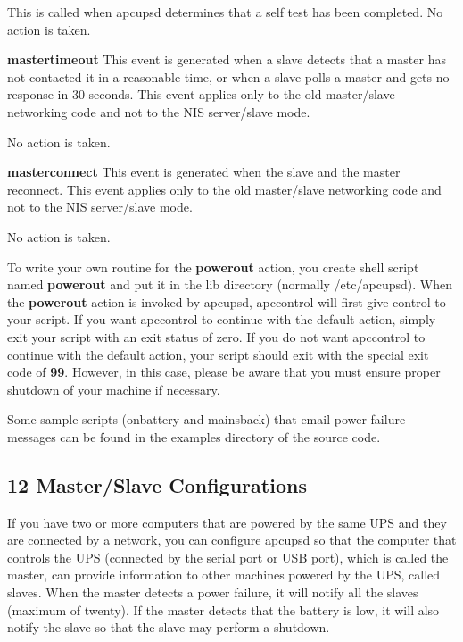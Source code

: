 \begin{description}
This is called when apcupsd determines that a self test has been completed. No
action is taken.  

\item {\bf mastertimeout}
This event is generated when a slave detects that a master has not contacted
it in a reasonable time, or when a slave polls a master and gets no response
in 30 seconds. This event applies only to the old master/slave networking code
and not to the NIS server/slave mode.  

No action is taken.  

\item {\bf masterconnect}
This event is generated when the slave and the master reconnect. This event
applies only to the old master/slave networking code and not to the NIS
server/slave mode.  

No action is taken. 
\end{description}

To write your own routine for the {\bf powerout} action, you create shell
script named {\bf powerout} and put it in the lib directory (normally
/etc/apcupsd).  When the {\bf powerout} action is invoked by apcupsd,
apccontrol will first give control to your script.  If you want apccontrol to
continue with the default action, simply exit your script with an exit status
of zero.  If you do not want apccontrol to continue with the default action,
your script should exit with the special exit code of {\bf 99}.  However, in
this case, please be aware that you must ensure proper shutdown of your
machine if necessary.  

Some sample scripts (onbattery and mainsback) that email power failure
messages can be found in the examples directory of the source code. 

\label{Master_002fSlave-Configurations}

\subsection*{12 Master/Slave Configurations}

\label{index-Master_002fSlave-152}
If you have two or more computers that are powered by the same UPS and they
are connected by a network, you can configure apcupsd so that the computer
that controls the UPS (connected by the serial port or USB port), which is
called the master, can provide information to other machines powered by the
UPS, called slaves. When the master detects a power failure, it will notify
all the slaves (maximum of twenty). If the master detects that the battery is
low, it will also notify the slave so that the slave may perform a shutdown.  

